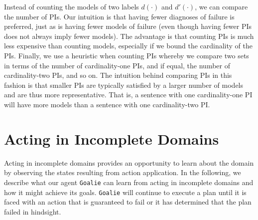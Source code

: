 \documentclass[letterpaper]{article}
\def\goalie{{\tt Goalie}}
\begin{document}
Instead of counting the models of two labels $d(\cdot)$ and $d'(\cdot)$, we can
compare the number of PIs.  Our intuition is that having fewer diagnoses of
failure is preferred, just as is having fewer models of failure (even though
having fewer PIs does not always imply fewer models).  The advantage is that
counting PIs is much less expensive than counting models, especially if we bound
the cardinality of the PIs.  Finally, we use a heuristic when counting PIs
whereby we compare two sets in terms of the number of cardinality-one PIs, and
if equal, the number of cardinality-two PIs, and so on.  The intuition behind
comparing PIs in this fashion is that smaller PIs are typically satisfied by a
larger number of models and are thus more representative.  That is, a sentence
with one cardinality-one PI will have more models than a sentence with one
cardinality-two PI.

\section{Acting in Incomplete Domains} Acting in incomplete domains provides an
opportunity to learn about the domain by observing the states resulting from
action application.  In the following, we describe what our agent \goalie{} can
learn from acting in incomplete domains and how it might achieve its goals.
\goalie{} will continue to execute a plan until it is faced with an action that
is guaranteed to fail or it has determined that the plan failed in hindsight.
\end{document}
